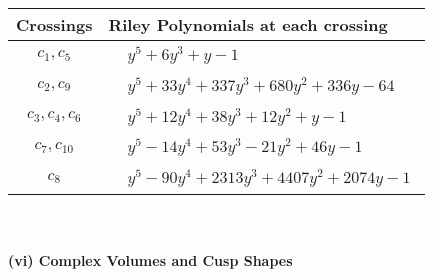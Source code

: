 \documentclass[1p]{elsarticle_modified}
\theoremstyle{definition}
\begin{document}
\begin{tabular}{m{50pt}|m{274pt}}
Crossings & \hspace{64pt}Riley Polynomials at each crossing \\
\hline $$\begin{aligned}c_{1},c_{5}\end{aligned}$$&$\begin{aligned}
&y^5+6 y^3+y-1
\end{aligned}$\\
\hline $$\begin{aligned}c_{2},c_{9}\end{aligned}$$&$\begin{aligned}
&y^5+33 y^4+337 y^3+680 y^2+336 y-64
\end{aligned}$\\
\hline $$\begin{aligned}c_{3},c_{4},c_{6}\end{aligned}$$&$\begin{aligned}
&y^5+12 y^4+38 y^3+12 y^2+y-1
\end{aligned}$\\
\hline $$\begin{aligned}c_{7},c_{10}\end{aligned}$$&$\begin{aligned}
&y^5-14 y^4+53 y^3-21 y^2+46 y-1
\end{aligned}$\\
\hline $$\begin{aligned}c_{8}\end{aligned}$$&$\begin{aligned}
&y^5-90 y^4+2313 y^3+4407 y^2+2074 y-1
\end{aligned}$\\
\hline
\end{tabular}\\~\\
\newpage\flushleft \textbf{(vi) Complex Volumes and Cusp Shapes}
\end{document}
